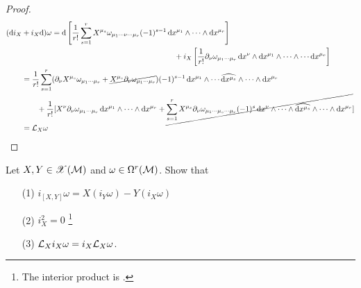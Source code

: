 \documentclass[a4paper, 10pt]{article}
\begin{document}
\begin{proof}
    \begin{align*}
        (\mathrm{d} i_{X}&+i_{X}\mathrm{d})\omega = \mathrm{d}\left[\frac{1}{r!}\sum_{s=1}^{r} X^{\mu_{s}}\omega_{\mu_{1}\cdots\nu\cdots\mu_{r}} (-1)^{s-1} \, \mathrm{d}{x}^{\mu_{1}} \wedge \cdots \wedge \mathrm{d}{x}^{\mu_{r}}\right] \\
        &\qquad\qquad\qquad\qquad\qquad\qquad\qquad\qquad\qquad\qquad + i_{X}\left[\frac{1}{r!}\partial_{\nu}\omega_{\mu_{1}\cdots\mu_{r}}\,\mathrm{d}{x}^{\nu}\wedge\mathrm{d}{x}^{\mu_{1}}\wedge\cdots\wedge\cdots\mathrm{d}{x}^{\mu_{r}}\right] \\
        &= \frac{1}{r!}\sum_{s=1}^{r} (\partial_{\nu}X^{\mu_{s}}\omega_{\mu_{1}\cdots\mu_{r}} + \cancel{X^{\mu_{s}}\partial_{\nu}\omega_{\mu_{1}\cdots\mu_{r}}})(-1)^{s-1}\,\mathrm{d}{x}^{\mu_{1}}\wedge\cdots\widehat{\mathrm{d}{x}^{\mu_{s}}}\wedge\cdots\wedge\mathrm{d}{x}^{\mu_{r}} \\
        &\qquad + \frac{1}{r!}[X^{\nu}\partial_{\nu}\omega_{\mu_{1}\cdots\mu_{r}}\,\mathrm{d}{x}^{\mu_{1}}\wedge\cdots\wedge\mathrm{d}{x}^{\mu_{r}} + \cancel{\sum_{s=1}^{r} X^{\mu_{s}}\partial_{\nu}\omega_{\mu_{1}\cdots\mu_{s}\cdots\mu_{r}}(-1)^{s}\,\mathrm{d}{x}^{\nu}\wedge\cdots\wedge\widehat{\mathrm{d}{x}^{\mu_{s}}}\wedge\cdots\wedge\mathrm{d}{x}^{\mu_{r}}}] \\
        &= \mathcal{L}_{X}\omega
    \end{align*}
\end{proof}
\newpage


\begin{exer}
    Let $X, Y \in \mathscr{X}(\mathcal{M})$ and $\omega \in \Omega^{r}(\mathcal{M})$. Show that
    \begin{itemize}
        \item[(1)] $i_{[X,Y]}\omega = X(i_{Y}\omega) - Y(i_{X}\omega)$
        \item[(2)] $i_{X}^{2} = 0$ \footnote{The interior product is .}
        \item[(3)] $\mathcal{L}_{X}i_{X}\omega = i_{X}\mathcal{L}_{X}\omega$.
    \end{itemize}
\end{exer}
\end{document}
